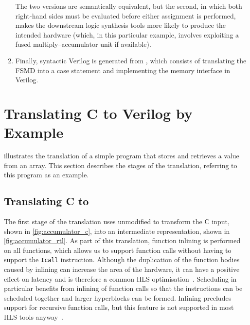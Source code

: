 \begin{enumerate}[label=\protect\blacknum{\arabic*}]
\begin{center}
\end{center}
%
The two versions are semantically equivalent, but the second, in which both
right-hand sides must be evaluated before either assignment is performed, makes
the downstream logic synthesis tools more likely to produce the intended
hardware (which, in this particular example, involves exploiting a fused
multiply--accumulator unit if available).
\item Finally, syntactic Verilog is generated from \htl{}, which consists of
  translating the \gls{FSMD} into a case statement and implementing the memory
  interface in Verilog.
\end{enumerate}

\section{Translating C to Verilog by Example}%
\label{sec:itv:translating-c-to-verilog}

 illustrates the translation of a simple program
that stores and retrieves a value from an array.  This section describes the
stages of the \vericert{} translation, referring to this program as an example.

\subsection{Translating C to \rtl{}}

The first stage of the translation uses unmodified \compcert{} to transform the
C input, shown in \cref{fig:accumulator_c}, into an \rtl{} intermediate
representation, shown in \cref{fig:accumulator_rtl}.  As part of this
translation, function inlining is performed on all functions, which allows us to
support function calls without having to support the \texttt{Icall} \rtl{}
instruction.  Although the duplication of the function bodies caused by inlining
can increase the area of the hardware, it can have a positive effect on latency
and is therefore a common HLS optimisation~\cite{noronha17_rapid_fpga}.
Scheduling in particular benefits from inlining of function calls so that the
instructions can be scheduled together and larger hyperblocks can be formed.
Inlining precludes support for recursive function calls, but this feature is not
supported in most HLS tools anyway~\cite{thomas16_srcht}.

